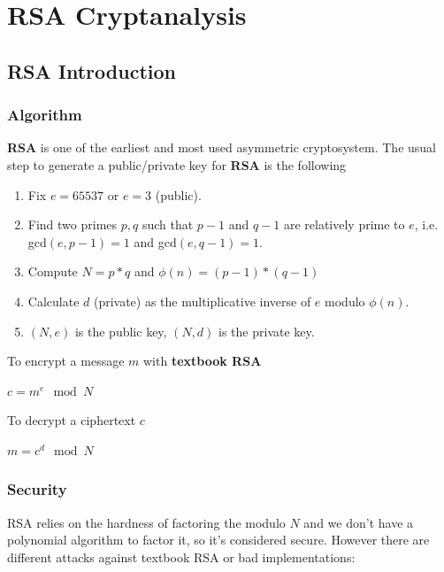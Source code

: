 \documentclass[a4paper,12pt]{report}
\begin{document}
\chapter{RSA Cryptanalysis}

\section{RSA Introduction}

\subsection{Algorithm}

\textbf{RSA} is one of the earliest and most used asymmetric cryptosystem.
The usual step to generate a public/private key for \textbf{RSA} is the following

\begin{enumerate}
    \item Fix $e = 65537$ or $e = 3$ (public).
    \item Find two primes $p, q$ such that $p - 1$ and $q - 1$ are relatively prime to $e$, i.e. gcd$(e, p-1) = 1$ and gcd$(e, q-1) = 1$.
    \item Compute $N = p * q$ and $\phi(n) = (p-1) * (q-1)$
    \item Calculate $d$ (private) as the multiplicative inverse of $e$ modulo $\phi(n)$.
    \item $(N, e)$ is the public key, $(N, d)$ is the private key.
\end{enumerate}

To encrypt a message $m$ with \textbf{textbook RSA}

\begin{center}
    $c = m^e \mod N$
\end{center}

To decrypt a ciphertext $c$

\begin{center}
    $m = c^d \mod N$
\end{center}

\subsection{Security}

RSA relies on the hardness of factoring the modulo $N$ and we don't have a polynomial algorithm to factor it, so it's considered secure.
However there are different attacks against textbook RSA or bad implementations:
\end{document}

